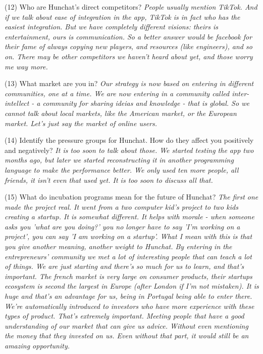 \documentclass[12pt]{article}
\begin{document}
(12) Who are Hunchat’s direct competitors? \textit{People usually mention TikTok. And if we talk about ease of integration in the app, TikTok is in fact who has the easiest integration. But we have completely different visions: theirs is entertainment, ours is communication. So a better answer would be facebook for their fame of always copying new players, and resources (like engineers), and so on. There may be other competitors we haven't heard about yet, and those worry me way more.}

(13) What market are you in? \textit{Our strategy is now based on entering in different communities, one at a time. We are now entering in a community called inter-intellect - a community for sharing ideias and knowledge - that is global.  So we cannot talk about local markets, like the American market, or the European market. Let's just say the market of online users.}

(14) Identify the pressure groups for Hunchat. How do they affect you positively and negatively? \textit{It is too soon to talk about those. We started testing the app two months ago, but later we started reconstructing it in another programming language to make the performance better. We only used ten more people, all friends, it isn't even that used yet. It is too soon to discuss all that. }

(15) What do incubation programs mean for the future of Hunchat? \textit{The first one made the project real. It went from a two computer kid's project to two kids creating a startup. It is somewhat different. It helps with morale - when someone asks you 'what are you doing?' you no longer have to say 'I'm working on a project', you can say 'I am working on a startup'. What I mean with this is that you give another meaning, another weight to Hunchat. By entering in the entrepreneurs' community we met a lot of interesting people that can teach a lot of things. We are just starting and there's so much for us to learn, and that's important. The french market is very large on consumer products, their startups ecosystem is second the largest in Europe (after London if I'm not mistaken). It is huge and that's an advantage for us, being in Portugal being able to enter there. We're automatically introduced to investors who have more experience with these types of product. That's extremely important. Meeting people that have a good understanding of our market that can give us advice. Without even mentioning the money that they invested on us. Even without that part, it would still be an amazing opportunity.}
\end{document}
